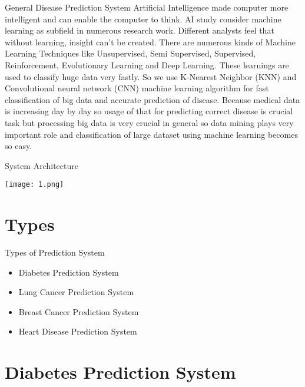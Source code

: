 \documentclass{SKP-beamer}
\begin{document}
\begin{frame}{General Disease Prediction System}
	Artificial Intelligence made computer more intelligent and can
	enable the computer to think. AI study consider machine
	learning as subfield in numerous research work. Different
	analysts feel that without learning, insight can't be created.
	There are numerous kinds of Machine Learning Techniques
	like Unsupervised, Semi Supervised, Supervised,
	Reinforcement, Evolutionary Learning and Deep Learning.
	These learnings are used to classify huge data very fastly. So
	we use K-Nearest Neighbor (KNN) and Convolutional neural
	network (CNN) machine learning algorithm for fast
	classification of big data and accurate prediction of disease.
	Because medical data is increasing day by day so usage of that
	for predicting correct disease is crucial task but processing big
	data is very crucial in general so data mining plays very
	important role and classification of large dataset using
	machine learning becomes so easy.
\end{frame}

\begin{frame}{System Architecture}
	\begin{center}
	\texttt{[image: 1.png]}
\end{center}
\end{frame}

\section{\textbf{Types}}

\begin{frame}{Types of Prediction System}
	\begin{itemize}
		\item Diabetes Prediction System
		\item Lung Cancer Prediction System
		\item Breast Cancer Prediction System
		\item Heart Disease Prediction System	
	\end{itemize}
\end{frame}



\section{\textbf{Diabetes Prediction System}}
\end{document}
